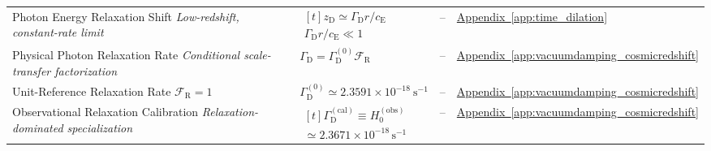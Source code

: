 \begin{longtable}{@{} p{4.5cm} p{6cm} c p{4cm} @{}}
{\raggedright Photon Energy Relaxation Shift \newline \textit{Low-redshift, constant-rate limit}\par} & {\raggedright $\begin{gathered}[t]z_{\mathrm D}\simeq\Gamma_{\mathrm D}r/c_{\mathrm E} \\ \Gamma_{\mathrm D}r/c_{\mathrm E}\ll1\end{gathered}$\par} & -- & {\raggedright \hyperref[app:time_dilation]{Appendix~\ref*{app:time_dilation}}\par} \\

{\raggedright Physical Photon Relaxation Rate \newline \textit{Conditional scale-transfer factorization}\par} & {\raggedright $\Gamma_{\mathrm D}=\Gamma_{\mathrm D}^{(0)}\mathcal F_{\mathrm R}$\par} & -- & {\raggedright \hyperref[app:vacuumdamping_cosmicredshift]{Appendix~\ref*{app:vacuumdamping_cosmicredshift}}\par} \\

{\raggedright Unit-Reference Relaxation Rate \newline \textit{$\mathcal F_{\mathrm R}=1$}\par} & {\raggedright $\Gamma_{\mathrm D}^{(0)}\simeq 2.3591\times10^{-18}\ \mathrm{s}^{-1}$\par} & -- & {\raggedright \hyperref[app:vacuumdamping_cosmicredshift]{Appendix~\ref*{app:vacuumdamping_cosmicredshift}}\par} \\

{\raggedright Observational Relaxation Calibration \newline \textit{Relaxation-dominated specialization}\par} & {\raggedright $\begin{gathered}[t]\Gamma_{\mathrm D}^{(\mathrm{cal})}\equiv H_0^{(\mathrm{obs})} \\ \simeq2.3671\times10^{-18}\,\mathrm{s^{-1}}\end{gathered}$\par} & -- & {\raggedright \hyperref[app:vacuumdamping_cosmicredshift]{Appendix~\ref*{app:vacuumdamping_cosmicredshift}}\par} \\


\end{longtable}

